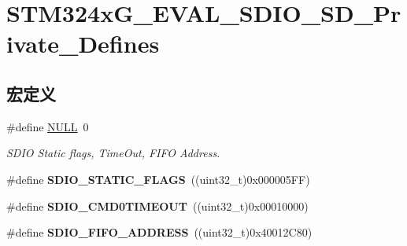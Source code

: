 \hypertarget{group___s_t_m324x_g___e_v_a_l___s_d_i_o___s_d___private___defines}{}\section{S\+T\+M324x\+G\+\_\+\+E\+V\+A\+L\+\_\+\+S\+D\+I\+O\+\_\+\+S\+D\+\_\+\+Private\+\_\+\+Defines}
\label{group___s_t_m324x_g___e_v_a_l___s_d_i_o___s_d___private___defines}
\subsection*{宏定义}
\begin{DoxyCompactItemize}
\item 
\#define \hyperlink{group___s_t_m324x_g___e_v_a_l___s_d_i_o___s_d___private___defines_ga070d2ce7b6bb7e5c05602aa8c308d0c4}{N\+U\+LL}~0\hypertarget{group___s_t_m324x_g___e_v_a_l___s_d_i_o___s_d___private___defines_ga070d2ce7b6bb7e5c05602aa8c308d0c4}{}\label{group___s_t_m324x_g___e_v_a_l___s_d_i_o___s_d___private___defines_ga070d2ce7b6bb7e5c05602aa8c308d0c4}

\begin{DoxyCompactList}\small\item\em S\+D\+IO Static flags, Time\+Out, F\+I\+FO Address. \end{DoxyCompactList}\item 
\#define {\bfseries S\+D\+I\+O\+\_\+\+S\+T\+A\+T\+I\+C\+\_\+\+F\+L\+A\+GS}~((uint32\+\_\+t)0x000005\+F\+F)\hypertarget{group___s_t_m324x_g___e_v_a_l___s_d_i_o___s_d___private___defines_gab07b969cd21592c74e8ad5d929e97055}{}\label{group___s_t_m324x_g___e_v_a_l___s_d_i_o___s_d___private___defines_gab07b969cd21592c74e8ad5d929e97055}

\item 
\#define {\bfseries S\+D\+I\+O\+\_\+\+C\+M\+D0\+T\+I\+M\+E\+O\+UT}~((uint32\+\_\+t)0x00010000)\hypertarget{group___s_t_m324x_g___e_v_a_l___s_d_i_o___s_d___private___defines_ga451e336c7bc16567a28475fcb75c9828}{}\label{group___s_t_m324x_g___e_v_a_l___s_d_i_o___s_d___private___defines_ga451e336c7bc16567a28475fcb75c9828}

\item 
\#define {\bfseries S\+D\+I\+O\+\_\+\+F\+I\+F\+O\+\_\+\+A\+D\+D\+R\+E\+SS}~((uint32\+\_\+t)0x40012\+C80)\hypertarget{group___s_t_m324x_g___e_v_a_l___s_d_i_o___s_d___private___defines_ga50b379bbcb59f027be37e9e787d3aa94}{}\label{group___s_t_m324x_g___e_v_a_l___s_d_i_o___s_d___private___defines_ga50b379bbcb59f027be37e9e787d3aa94}


\end{DoxyCompactItemize}
